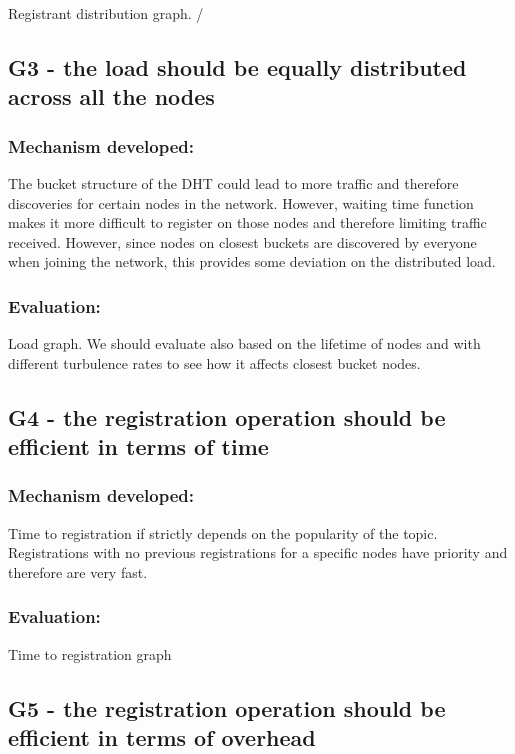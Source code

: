 Registrant distribution graph. /

\subsection{G3 - the load should be equally distributed across all the nodes}

\subsubsection{Mechanism developed:} 

The bucket structure of the DHT could lead to more traffic and therefore discoveries for certain nodes in the network.  However, waiting time function makes it more difficult to register on those nodes and therefore limiting traffic received.
However, since nodes on closest buckets are discovered by everyone when joining the network,  this provides some deviation on the  distributed load.  

\subsubsection{Evaluation: }

Load graph. 
We should evaluate also based on the lifetime of nodes
and with different turbulence rates to see how it 
affects closest bucket nodes.

\subsection{G4 - the registration operation should be efficient in terms of time}

\subsubsection{Mechanism developed:} 

Time to registration if strictly depends on the popularity of the topic. 
Registrations with no previous registrations for a specific nodes have priority and therefore are very fast.

\subsubsection{Evaluation: }

Time to registration graph

\subsection{G5 - the registration operation should be efficient in terms of overhead}

